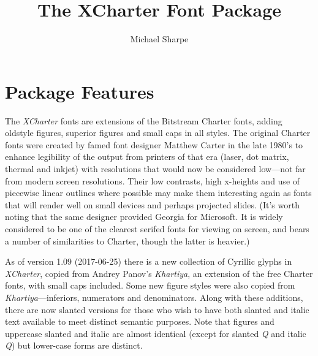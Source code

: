 \documentclass[11pt]{article}
\title{The XCharter Font Package}
\author{Michael Sharpe}
\begin{document}
\maketitle
\section{Package Features}
The \emph{XCharter} fonts are extensions of the Bitstream Charter fonts, adding oldstyle figures, superior figures and small caps in all styles. The original Charter fonts were created by famed font designer Matthew Carter in the late 1980's to enhance legibility of the output from printers of that era (laser, dot matrix, thermal and inkjet) with resolutions that would now be considered low---not far from modern screen resolutions. Their low contrasts, high x-heights and use of piecewise linear outlines where possible may make them interesting again as fonts that will render well on small devices and perhaps projected slides. (It's worth noting that the same designer provided Georgia for Microsoft. It is widely considered to be one of the clearest serifed fonts for viewing on screen, and bears a number of similarities to Charter, though the latter is  heavier.) 

As of version 1.09 (2017-06-25) there is a new collection of Cyrillic glyphs in \emph{XCharter}, copied from Andrey Panov's \emph{Khartiya}, an extension of the free Charter fonts, with small caps included. Some new figure styles were also copied from \emph{Khartiya}---inferiors, numerators and denominators. Along with these additions, there are now slanted versions for those who wish to have both slanted and italic text available to meet distinct semantic purposes. Note that figures and uppercase slanted and italic are almost identical (except for slanted \textsl{Q} and italic \textit{Q}) but lower-case forms are distinct.
\end{document}
